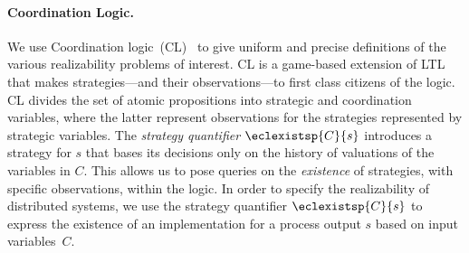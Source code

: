 \documentclass{LMCS}
\theoremstyle{plain}\newtheorem{theorem}[thm]{Theorem}
\theoremstyle{plain}\newtheorem{lemma}[thm]{Lemma}
\theoremstyle{plain}\newtheorem{proposition}[thm]{Proposition}
\theoremstyle{plain}\newtheorem{corollary}[thm]{Corollary}
\theoremstyle{definition}\newtheorem{definition}{Definition}[section]
\begin{document}
\paragraph{\bf Coordination Logic.}
We use  Coordination logic~(CL)~\cite{DBLP:conf/csl/FinkbeinerS10} to give uniform and precise definitions of the various realizability problems of interest.
CL is a game-based extension of LTL that makes strategies---and their observations---to first class citizens of the logic.
CL divides the set of atomic propositions into strategic and coordination variables, where the latter represent observations for the strategies represented by strategic variables.
The \emph{strategy quantifier} $\eclexistsp{C}{s}$ introduces a strategy for $s$ that bases its decisions only on the history of valuations of the variables in $C$.
This allows us to pose queries on the \emph{existence} of strategies, with specific observations, within the logic.
In order to specify the realizability of distributed systems, we use the strategy quantifier $\eclexistsp{C}{s}$ to express the existence of an implementation for a process output $s$ based on input variables~$C$.
\end{document}
